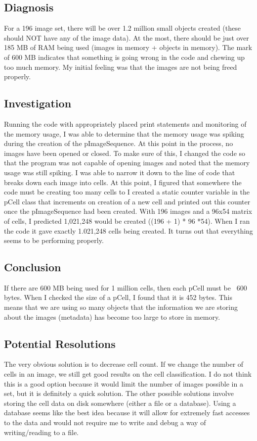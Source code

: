 \documentclass[]{article}
\begin{document}
		\subsection{Diagnosis}
			For a 196 image set, there will be over 1.2 million small objects created (these should NOT have any of the image data). At the most, there should be just over 185 MB of RAM being used (images in memory + objects in memory). The mark of 600 MB indicates that something is going wrong in the code and chewing up too much memory. My initial feeling was that the images are not being freed properly.
			
		\subsection{Investigation}
			Running the code with appropriately placed print statements and monitoring of the memory usage, I was able to determine that the memory usage was spiking during the creation of the pImageSequence. At this point in the process, no images have been opened or closed. To make sure of this, I changed the code so that the program was not capable of opening images and noted that the memory usage was still spiking. I was able to narrow it down to the line of code that breaks down each image into cells. At this point, I figured that somewhere the code must be creating too many cells to I created a static counter variable in the pCell class that increments on creation of a new cell and printed out this counter once the pImageSequence had been created. With 196 images and a 96x54 matrix of cells, I predicted 1,021,248 would be created ((196 + 1) * 96 *54). When I ran the code it gave exactly 1.021,248 cells being created. It turns out that everything seems to be performing properly.
			
		\subsection{Conclusion}
			If there are 600 MB being used for 1 million cells, then each pCell must be ~600 bytes. When I checked the size of a pCell, I found that it is 452 bytes. This means that we are using so many objects that the information we are storing about the images (metadata) has become too large to store in memory. 
			
		\subsection{Potential Resolutions}
			The very obvious solution is to decrease cell count. If we change the number of cells in an image, we still get good results on the cell classification. I do not think this is a good option because it would limit the number of images possible in a set, but it is definitely a quick solution. The other possible solutions involve storing the cell data on disk somewhere (either a file or a database). Using a database seems like the best idea because it will allow for extremely fast accesses to the data and would not require me to write and debug a way of writing/reading to a file. 
			
\end{document}
